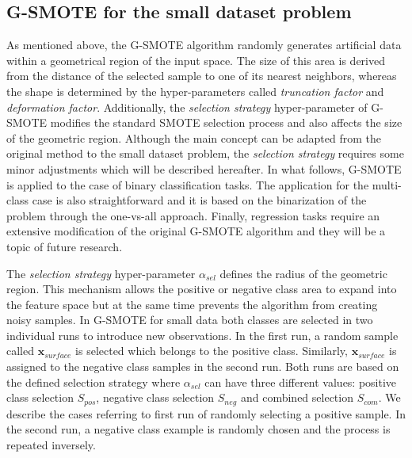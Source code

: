 \documentclass[parskip=full]{scrartcl}
\begin{document}
\subsection{G-SMOTE for the small dataset problem}

As mentioned above, the G-SMOTE algorithm randomly generates artificial data
within a geometrical region of the input space. The size of this area is derived
from the distance of the selected sample to one of its nearest neighbors,
whereas the shape is determined by the hyper-parameters called
\textit{truncation factor} and \textit{deformation factor}. Additionally, the
\textit{selection strategy} hyper-parameter  of G-SMOTE modifies the standard
SMOTE selection process and also affects the size of the geometric region.
Although the main concept can be adapted from the original method to the small
dataset problem, the \textit{selection strategy} requires some minor adjustments which
will be described hereafter. In what follows, G-SMOTE is applied to the case of
binary classification tasks. The application for the multi-class case is also
straightforward and it is based on the binarization of the problem through the
one-vs-all approach. Finally, regression tasks require an extensive modification
of the original G-SMOTE algorithm and they will be a topic of future research.

The \textit{selection strategy} hyper-parameter \( \alpha_{sel} \) defines the
radius of the geometric region. This mechanism allows the positive or negative
class area to expand into the feature space but at the same time prevents the
algorithm from creating noisy samples. In G-SMOTE for small data both classes
are selected in two individual runs to introduce new observations. In the first
run, a random sample called \( \textbf{x}_{surface} \) is selected which belongs
to the positive class. Similarly, \( \textbf{x}_{surface} \) is assigned to the
negative class samples in the second run. Both runs are based on the defined
selection strategy where \( \alpha_{sel} \) can have three different values:
positive class selection \( S_{pos} \), negative class selection \( S_{neg} \)
and combined selection \( S_{com} \). We describe the cases referring to first
run of randomly selecting a positive sample. In the second run, a negative class
example is randomly chosen and the process is repeated inversely. 
\end{document}
